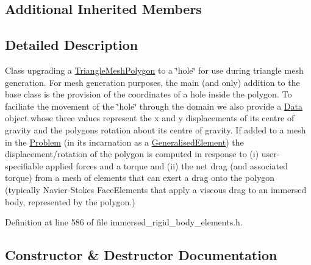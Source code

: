 \subsection*{Additional Inherited Members}


\subsection{Detailed Description}
Class upgrading a \hyperlink{classoomph_1_1TriangleMeshPolygon}{Triangle\+Mesh\+Polygon} to a \char`\"{}hole\char`\"{} for use during triangle mesh generation. For mesh generation purposes, the main (and only) addition to the base class is the provision of the coordinates of a hole inside the polygon. To faciliate the movement of the \char`\"{}hole\char`\"{} through the domain we also provide a \hyperlink{classoomph_1_1Data}{Data} object whose three values represent the x and y displacements of its centre of gravity and the polygon\textquotesingle{}s rotation about its centre of gravity. If added to a mesh in the \hyperlink{classoomph_1_1Problem}{Problem} (in its incarnation as a \hyperlink{classoomph_1_1GeneralisedElement}{Generalised\+Element}) the displacement/rotation of the polygon is computed in response to (i) user-\/specifiable applied forces and a torque and (ii) the net drag (and associated torque) from a mesh of elements that can exert a drag onto the polygon (typically Navier-\/\+Stokes Face\+Elements that apply a viscous drag to an immersed body, represented by the polygon.) 

Definition at line 586 of file immersed\+\_\+rigid\+\_\+body\+\_\+elements.\+h.



\subsection{Constructor \& Destructor Documentation}
\mbox{\label{classoomph_1_1ImmersedRigidBodyTriangleMeshPolygon_a048f25b4b6b89a1f992e491d9f3aa75f}} 
